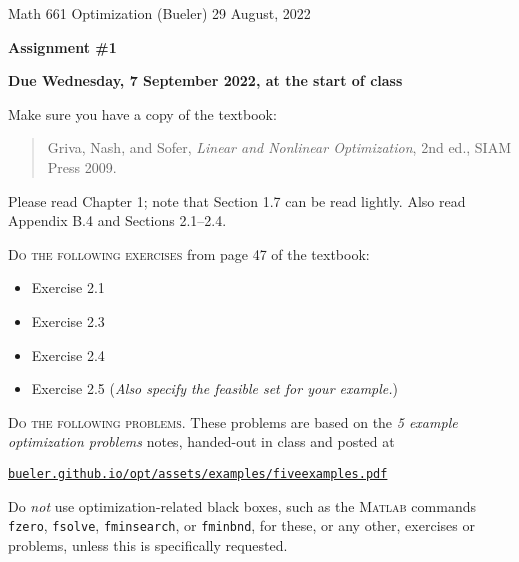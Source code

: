 \documentclass[12pt]{amsart}
\newcommand{\Matlab}{\textsc{Matlab}\xspace}
\begin{document}
\scriptsize \noindent Math 661 Optimization (Bueler) \hfill 29 August, 2022
\normalsize

\medskip\bigskip

\Large\centerline{\textbf{Assignment \#1}}
\large
\bigskip

\centerline{\textbf{Due Wednesday, 7 September 2022, at the start of class}}
\bigskip
\normalsize

\thispagestyle{empty}

\bigskip
\noindent Make sure you have a copy of the textbook:

\begin{quote}
Griva, Nash, and Sofer, \emph{Linear and Nonlinear Optimization}, 2nd ed., SIAM Press 2009.
\end{quote}

\noindent Please read Chapter 1; note that Section 1.7 can be read lightly.  Also read Appendix B.4 and Sections 2.1--2.4.

\bigskip
\noindent \textsc{Do the following exercises} from page 47 of the textbook:

\begin{itemize}
\item Exercise 2.1
\item Exercise 2.3
\item Exercise 2.4
\item Exercise 2.5 \quad (\emph{Also specify the feasible set for your example.})
\end{itemize}

\bigskip
\noindent \textsc{Do the following problems.}  These problems are based on the \emph{5 example optimization problems} notes, handed-out in class and posted at

\centerline{\href{https://bueler.github.io/opt/assets/examples/fiveexamples.pdf}{\texttt{bueler.github.io/opt/assets/examples/fiveexamples.pdf}}}

\noindent Do \emph{not} use optimization-related black boxes, such as the \Matlab commands \texttt{fzero}, \texttt{fsolve}, \texttt{fminsearch}, or \texttt{fminbnd}, for these, or any other, exercises or problems, unless this is specifically requested.
\end{document}
